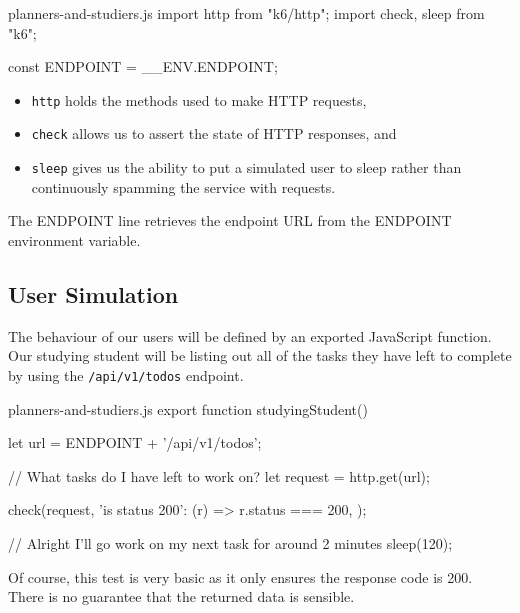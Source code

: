 \documentclass{csse4400}
\begin{document}
\begin{code}[language=JavaScript,numbers=none]{planners-and-studiers.js}
import http from "k6/http";
import { check, sleep } from "k6";

const ENDPOINT = __ENV.ENDPOINT;
\end{code}

\begin{itemize}
    \item \texttt{http} holds the methods used to make HTTP requests,
    \item \texttt{check} allows us to assert the state of HTTP responses, and
    \item \texttt{sleep} gives us the ability to put a simulated user to sleep rather than continuously spamming the service with requests.
\end{itemize}

The ENDPOINT line retrieves the endpoint URL from the ENDPOINT environment variable.

\subsection{User Simulation}

The behaviour of our users will be defined by an exported JavaScript function.
Our studying student will be listing out all of the tasks they have left to complete by using the \texttt{/api/v1/todos} endpoint.

\begin{code}[language=JavaScript,numbers=none]{planners-and-studiers.js}
export function studyingStudent() {
    let url = ENDPOINT + '/api/v1/todos';

    // What tasks do I have left to work on?
    let request = http.get(url);

    check(request, {
        'is status 200': (r) => r.status === 200,
    });
    
    // Alright I'll go work on my next task for around 2 minutes
    sleep(120);
}
\end{code}

Of course,
this test is very basic as it only ensures the response code is 200.
There is no guarantee that the returned data is sensible.

\end{document}
